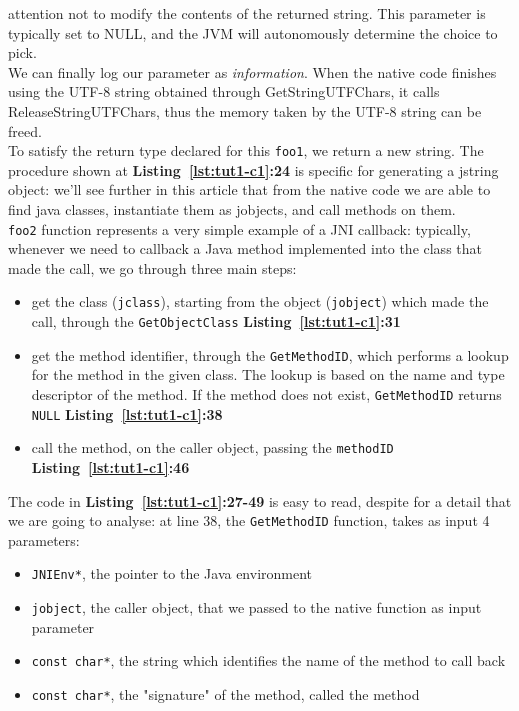 \documentclass[a4paper,10pt]{article}
\newcommand{\keyword}[1]{\texttt{#1}}
\newcommand{\refl}[1]{\textbf{Listing~\ref{#1}}}
\begin{document}
\begin{multicols}{2}
attention not to modify the contents of the returned string. This parameter is
typically set to NULL, and the JVM will autonomously determine the choice to
pick.\\
We can finally log our parameter as \textit{information}. When the native code
finishes using the UTF-8 string obtained through GetStringUTFChars, it calls
ReleaseStringUTFChars, thus the memory taken by the UTF-8 string can be freed.\\
To satisfy the return type declared for this \keyword{foo1}, we return a new
string. The procedure shown at \refl{lst:tut1-c1}\textbf{:24} is specific for
generating a jstring object: we'll see further in this article that from the
native code we are able to find java classes, instantiate them as jobjects, and
call methods on them.\\
\keyword{foo2} function represents a very simple example of a JNI callback:
typically, whenever we need to callback a Java method implemented into the class
that made the call, we go through three main steps:
\begin{itemize}
\item get the class (\keyword{jclass}), starting from the object
(\keyword{jobject}) which made the call, through the \keyword{GetObjectClass}
\refl{lst:tut1-c1}\textbf{:31}
\item get the method identifier, through the \keyword{GetMethodID}, which
performs a lookup for the method in the given class. The lookup is based on
the name and type descriptor of the method. If the method does not exist,
\keyword{GetMethodID} returns \keyword{NULL} \refl{lst:tut1-c1}\textbf{:38}
\item call the method, on the caller object, passing the \keyword{methodID}
\refl{lst:tut1-c1}\textbf{:46}
\end{itemize}
The code in \refl{lst:tut1-c1}\textbf{:27-49} is easy to read, despite for a
detail that we are going to analyse: at line 38, the \keyword{GetMethodID}
function, takes as input 4 parameters:
\begin{itemize}
\item \keyword{JNIEnv*}, the pointer to the Java environment
\item \keyword{jobject}, the caller object, that we passed to the native
function as input parameter
\item \keyword{const char*}, the string which identifies the name of the method
to call back
\item \keyword{const char*}, the "signature" of the method, called the method

\end{itemize}
\end{multicols}
\end{document}
